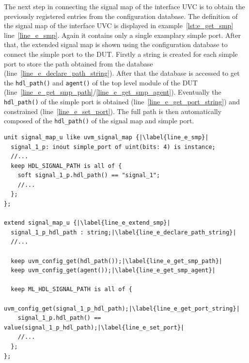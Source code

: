 The next step in connecting the signal map of the interface UVC is to obtain the previously registered entries from the configuration database. The definition of the signal map of the interface UVC is displayed in example~\ref{lst:e_get_smp} line~\ref{line_e_smp}. Again it contains only a single examplary simple port. After that, the extended signal map is shown using the configuration database to connect the simple port to the DUT. Firstly a string is created for each simple port to store the path obtained from the database (line~\ref{line_e_declare_path_string}). After that the database is accessed to get the \lstinline$hdl_path()$ and \lstinline$agent()$ of the top level module of the DUT (line~\ref{line_e_get_smp_path}/\ref{line_e_get_smp_agent}). Eventually the \lstinline$hdl_path()$ of the simple port is obtained (line~\ref{line_e_get_port_string}) and constrained (line~\ref{line_e_set_port}). The full path is then automatically composed of the \lstinline$hdl_path()$ of the signal map and simple port.
\lstset{language=e, numbers = left, escapechar=|, breaklines=true}
\begin{lstlisting}[frame=htrbl, caption={\textit{e}: getting the simple port configuration of the UVM-\textit{e} signal map},
label={lst:e_get_smp}]
unit signal_map_u like uvm_signal_map {|\label{line_e_smp}|
  signal_1_p: inout simple_port of uint(bits: 4) is instance;
  //...
  keep HDL_SIGNAL_PATH is all of {
    soft signal_1_p.hdl_path() == "signal_1";
    //...
  };
};

extend signal_map_u {|\label{line_e_extend_smp}|
  signal_1_p_hdl_path : string;|\label{line_e_declare_path_string}|
  //...

  keep uvm_config_get(hdl_path());|\label{line_e_get_smp_path}|
  keep uvm_config_get(agent());|\label{line_e_get_smp_agent}|

  keep ML_HDL_SIGNAL_PATH is all of {
    uvm_config_get(signal_1_p_hdl_path);|\label{line_e_get_port_string}|
    signal_1_p.hdl_path() == value(signal_1_p_hdl_path);|\label{line_e_set_port}|
    //...
  };
}; 
\end{lstlisting}
